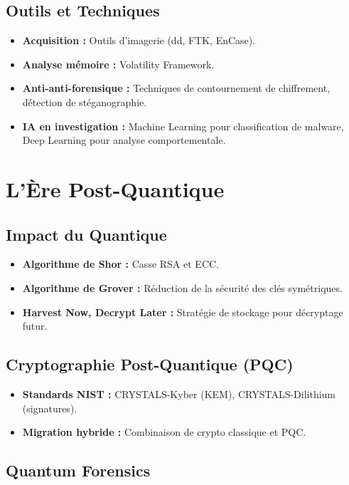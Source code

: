\documentclass[12pt]{article}
\begin{document}
\subsection{Outils et Techniques}

\begin{itemize}
    \item \textbf{Acquisition :} Outils d'imagerie (dd, FTK, EnCase).
    \item \textbf{Analyse mémoire :} Volatility Framework.
    \item \textbf{Anti-anti-forensique :} Techniques de contournement de chiffrement, détection de stéganographie.
    \item \textbf{IA en investigation :} Machine Learning pour classification de malware, Deep Learning pour analyse comportementale.
\end{itemize}

\section{L'Ère Post-Quantique}

\subsection{Impact du Quantique}

\begin{itemize}
    \item \textbf{Algorithme de Shor :} Casse RSA et ECC.
    \item \textbf{Algorithme de Grover :} Réduction de la sécurité des clés symétriques.
    \item \textbf{Harvest Now, Decrypt Later :} Stratégie de stockage pour décryptage futur.
\end{itemize}

\subsection{Cryptographie Post-Quantique (PQC)}

\begin{itemize}
    \item \textbf{Standards NIST :} CRYSTALS-Kyber (KEM), CRYSTALS-Dilithium (signatures).
    \item \textbf{Migration hybride :} Combinaison de crypto classique et PQC.
\end{itemize}

\subsection{Quantum Forensics}
\end{document}
